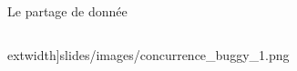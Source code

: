 \begin{frame}[fragile]{Le partage de donnée}
\begin{columns}
extwidth]{slides/images/concurrence_buggy_1.png}
\end{columns}
\end{frame}

